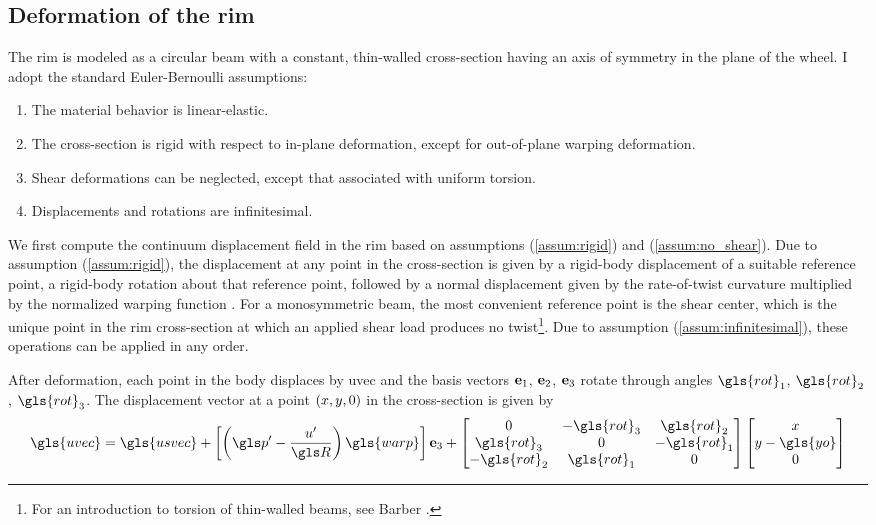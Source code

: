 \documentclass[\rootdir/thesis.tex]{subfiles}
\begin{document}
\subsection{Deformation of the rim}
\label{sec:rim_strain_energy}

The rim is modeled as a circular beam with a constant, thin-walled cross-section having an axis of symmetry in the plane of the wheel. I adopt the standard Euler-Bernoulli assumptions:

\begin{enumerate}
	\item{The material behavior is linear-elastic.}\label{assum:elastic}
	\item{The cross-section is rigid with respect to in-plane deformation, except for out-of-plane warping deformation.}\label{assum:rigid}
	\item{Shear deformations can be neglected, except that associated with uniform torsion.}\label{assum:no_shear}
	\item{Displacements and rotations are infinitesimal.}\label{assum:infinitesimal}
\end{enumerate}

We first compute the continuum displacement field in the rim based on assumptions (\ref{assum:rigid}) and (\ref{assum:no_shear}). Due to assumption (\ref{assum:rigid}), the displacement at any point in the cross-section is given by a rigid-body displacement of a suitable reference point, a rigid-body rotation about that reference point, followed by a normal displacement given by the rate-of-twist curvature multiplied by the normalized warping function \cite{Timoshenko1961}. For a monosymmetric beam, the most convenient reference point is the shear center, which is the unique point in the rim cross-section at which an applied shear load produces no twist\footnote{For an introduction to torsion of thin-walled beams, see Barber \cite{Barber2011}.}. Due to assumption (\ref{assum:infinitesimal}), these operations can be applied in any order.

After deformation, each point in the body displaces by \gls{uvec} and the basis vectors $\mathbf{e}_1$, $\mathbf{e}_2$, $\mathbf{e}_3$ rotate through angles $\gls{rot}_1$, $\gls{rot}_2$, $\gls{rot}_3$. The displacement vector at a point $(x, y, 0)$ in the cross-section is given by
\begin{equation}
\label{eq:u}
\gls{uvec} = \gls{usvec} + \left[\left(\p' - \frac{u'}{\R}\right)\gls{warp}\right]\eh +
\begin{bmatrix}
0        & -\gls{rot}_3& \gls{rot}_2\\
\gls{rot}_3 & 0        & -\gls{rot}_1\\
-\gls{rot}_2& \gls{rot}_1 & 0
\end{bmatrix}
\begin{bmatrix}\x\\\y - \gls{yo}\\0\end{bmatrix}
\end{equation}
\end{document}
